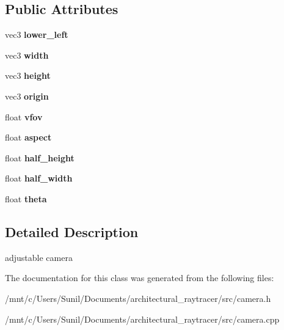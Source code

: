 \subsection*{Public Attributes}
\begin{DoxyCompactItemize}
\item 
\mbox{\label{classcamera_a2f92acd972a066f66e23fe1bf2dd2103}} 
vec3 {\bfseries lower\+\_\+left}
\item 
\mbox{\label{classcamera_a079a21af8444ce2fa7f324382de572cf}} 
vec3 {\bfseries width}
\item 
\mbox{\label{classcamera_a86f4f180a82dfe1547f5a68c40aaf40c}} 
vec3 {\bfseries height}
\item 
\mbox{\label{classcamera_a0e8ae66c9bc5ce2a29a5ca9e029d8273}} 
vec3 {\bfseries origin}
\item 
\mbox{\label{classcamera_a00668ef9694435ed11bd724db3d990d6}} 
float {\bfseries vfov}
\item 
\mbox{\label{classcamera_ae5e04a9d27bbfa0a4d36494c181c2890}} 
float {\bfseries aspect}
\item 
\mbox{\label{classcamera_a7c3ed00791d2ec6b83eb2a8f8eba0551}} 
float {\bfseries half\+\_\+height}
\item 
\mbox{\label{classcamera_a8652265a457b06b1c184e09b56fe8194}} 
float {\bfseries half\+\_\+width}
\item 
\mbox{\label{classcamera_a6bbc5464ba7372a1fa783ba3c6719979}} 
float {\bfseries theta}
\end{DoxyCompactItemize}


\subsection{Detailed Description}
adjustable camera 

The documentation for this class was generated from the following files\+:\begin{DoxyCompactItemize}
\item 
/mnt/c/\+Users/\+Sunil/\+Documents/architectural\+\_\+raytracer/src/camera.\+h\item 
/mnt/c/\+Users/\+Sunil/\+Documents/architectural\+\_\+raytracer/src/camera.\+cpp\end{DoxyCompactItemize}
